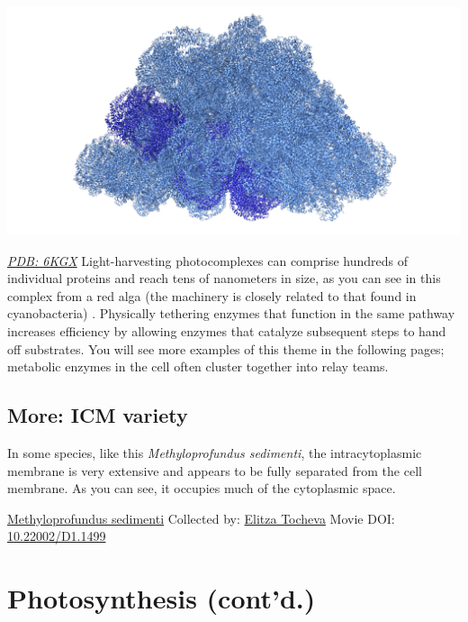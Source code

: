 \documentclass[]{tufte-book}
\begin{document}
\includegraphics{img/schematics/4_3_1}

\href{http://rcsb.org/structure/6KGX}{\emph{PDB: 6KGX}}
Light-harvesting photocomplexes can comprise hundreds of individual proteins and reach tens of nanometers in size, as you can see in this complex from a red alga (the machinery is closely related to that found in cyanobacteria) \citep{ma2020}. Physically tethering enzymes that function in the same pathway increases efficiency by allowing enzymes that catalyze subsequent steps to hand off substrates. You will see more examples of this theme in the following pages; metabolic enzymes in the cell often cluster together into relay teams.

\hypertarget{ICM_variety}{%
\subsection*{More: ICM variety}\label{ICM_variety}}

In some species, like this \emph{Methyloprofundus sedimenti}, the intracytoplasmic membrane is very extensive and appears to be fully separated from the cell membrane. As you can see, it occupies much of the cytoplasmic space.



\hypertarget{htmlwidget-53081aa75c9bd2664196}{}

\label{fig:4-3a}\protect\hyperlink{tree}{Methyloprofundus sedimenti} Collected by: \protect\hyperlink{elitza_tocheva}{Elitza Tocheva} Movie DOI: \href{https://doi.org/10.22002/D1.1499}{10.22002/D1.1499}

\hypertarget{photosynthesis-contd.}{%
\section{Photosynthesis (cont'd.)}\label{photosynthesis-contd.}}
\end{document}
